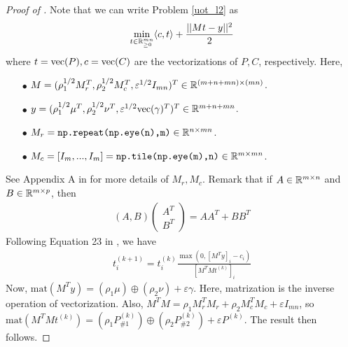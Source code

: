 \begin{proof}[Proof of ]
Note that we can write Problem \eqref{uot_l2} as
\begin{align}
    \min_{t \in \mathbb R^{mn}_{\geq 0}} \langle c, t \rangle + \frac{|| Mt - y ||^2}{2}
\end{align}
where $t = \text{vec}(P), c = \text{vec}(C)$ are the vectorizations of $P, C$, respectively. Here,
\begin{itemize}
    \item[$\bullet$] $M = (\rho_1^{1/2} M_r^T, \rho_2^{1/2} M_c^T, \varepsilon^{1/2} I_{mn})^T \in \mathbb R^{(m + n + mn) \times (mn)}$.

    \item[$\bullet$] $y = (\rho_1^{1/2} \mu^T, \rho_2^{1/2} \nu^T, \varepsilon^{1/2} \text{vec}(\gamma)^T)^T \in \mathbb R^{m + n + mn}$.

    \item[$\bullet$] $M_r = \texttt{np.repeat(np.eye(n),m)} \in \mathbb R^{n \times mn}$.

    \item[$\bullet$] $M_c = [I_m, ..., I_m] = \texttt{np.tile(np.eye(m),n)} \in \mathbb R^{m \times mn}$.
\end{itemize}
See Appendix A in \citep{Chapel21} for more details of $M_r, M_c$.
Remark that if $A \in \mathbb R^{m \times n}$ and $B \in \mathbb R^{m \times p}$, then
\begin{align}
    (A, B) \begin{pmatrix}
        A^T \\
        B^T
    \end{pmatrix}
    = A A^T + B B^T
\end{align}
Following Equation 23 in \citep{Chapel21},  we have
\begin{align}
    t^{(k+1)}_i = t^{(k)}_i \frac{\max( 0, [M^T y]_i - c_i)}{[M^T M t^{(k)}]_i}
\end{align}
Now, $\text{mat}(M^T y) = (\rho_1 \mu) \oplus (\rho_2 \nu) + \varepsilon \gamma$.
Here, matrization is the inverse operation of vectorization. Also,
$M^T M = \rho_1 M_r^T M_r + \rho_2 M_c^T M_c + \varepsilon I_{mn}$, so
$\text{mat}(M^T M t^{(k)}) = (\rho_1 P_{\# 1}^{(k)}) \oplus (\rho_2 P_{\# 2}^{(k)})
+ \varepsilon P^{(k)} $. The result then follows.
\end{proof}

